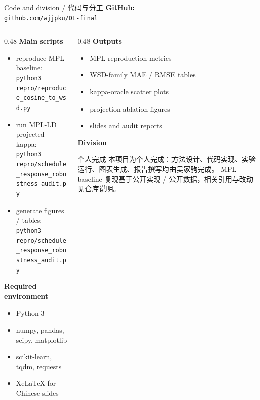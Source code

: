 \documentclass[9pt,aspectratio=169,fontset=fandol]{ctexbeamer}
\newcommand{\code}[1]{\texttt{\small #1}}
\newcommand{\tightlist}{\setlength{\itemsep}{2pt}\setlength{\parskip}{0pt}}
\begin{document}
\begin{frame}{Code and division / 代码与分工}
\small
\textbf{GitHub:}\\
\code{github.com/wjjpku/DL-final}

\vfill
\begin{columns}[T]
\begin{column}{0.48\textwidth}
\textbf{Main scripts}
\begin{itemize}\tightlist
\item reproduce MPL baseline:\\
\code{python3 repro/reproduce\_cosine\_to\_wsd.py}
\item run MPL-LD projected kappa:\\
\code{python3 repro/schedule\_response\_robustness\_audit.py}
\item generate figures / tables:\\
\code{python3 repro/schedule\_response\_robustness\_audit.py}
\end{itemize}

\textbf{Required environment}
\begin{itemize}\tightlist
\item Python 3
\item numpy, pandas, scipy, matplotlib
\item scikit-learn, tqdm, requests
\item XeLaTeX for Chinese slides
\end{itemize}
\end{column}
\begin{column}{0.48\textwidth}
\textbf{Outputs}
\begin{itemize}\tightlist
\item MPL reproduction metrics
\item WSD-family MAE / RMSE tables
\item kappa-oracle scatter plots
\item projection ablation figures
\item slides and audit reports
\end{itemize}

\textbf{Division}
\begin{block}{个人完成}
本项目为个人完成：方法设计、代码实现、实验运行、图表生成、报告撰写均由吴家驹完成。
MPL baseline 复现基于公开实现 / 公开数据，相关引用与改动见仓库说明。
\end{block}
\end{column}
\end{columns}
\end{frame}
\end{document}

